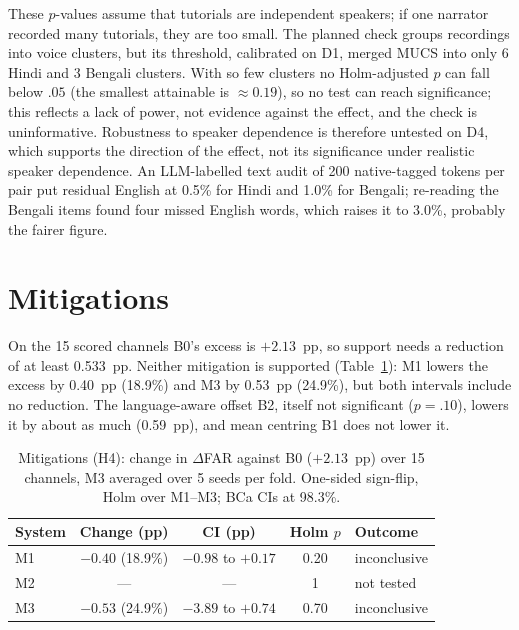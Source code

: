\documentclass[conference]{IEEEtran}
\begin{document}
These $p$-values assume that tutorials are independent speakers; if one narrator recorded
many tutorials, they are too small. The planned check groups recordings into voice
clusters, but its threshold, calibrated on D1, merged MUCS into only 6 Hindi and 3 Bengali
clusters. With so few clusters no Holm-adjusted $p$ can fall below $.05$ (the smallest attainable is $\approx 0.19$), so no test can reach significance; this reflects a lack of power, not evidence against the effect, and the check is uninformative. Robustness
to speaker dependence is therefore untested on D4, which supports the direction of the
effect, not its significance under realistic speaker dependence. An LLM-labelled text audit of 200 native-tagged tokens per pair put residual English at 0.5\% for Hindi and 1.0\% for Bengali; re-reading the Bengali items found four missed English words, which raises it to 3.0\%, probably the fairer figure.

\section{Mitigations}
\label{sec:mitigations}
On the 15 scored channels B0's excess is $+2.13$~pp, so support needs a reduction of at least 0.533~pp. Neither mitigation is supported (Table~\ref{tab:h4}): M1 lowers the excess by
0.40~pp (18.9\%) and M3 by 0.53~pp (24.9\%), but both intervals include no reduction. The
language-aware offset B2, itself not significant ($p=.10$), lowers it by about as much
(0.59~pp), and mean centring B1 does not lower it.

\begin{table}[t]
\caption{Mitigations (H4): change in $\Delta$FAR against B0 ($+2.13$~pp) over 15 channels,
M3 averaged over 5 seeds per fold. One-sided sign-flip, Holm over M1--M3; BCa CIs at
98.3\%.}
\label{tab:h4}
\centering
\setlength{\tabcolsep}{4pt}
\begin{tabular}{lcccl}
\toprule
System & Change (pp) & CI (pp) & Holm $p$ & Outcome \\
\midrule
M1 & $-0.40$ (18.9\%) & $-0.98$ to $+0.17$ & 0.20 & inconclusive \\
M2 & --- & --- & 1 & not tested \\
M3 & $-0.53$ (24.9\%) & $-3.89$ to $+0.74$ & 0.70 & inconclusive \\
\bottomrule
\end{tabular}
\end{table}
\end{document}

